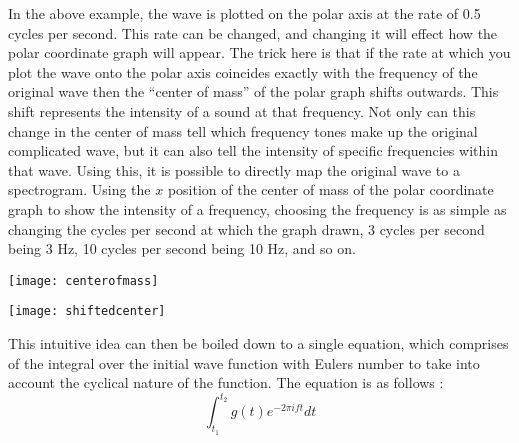 In the above example, the wave is plotted on the polar axis at the rate of 0.5 cycles per second. This rate can be changed, and changing it will effect how the polar coordinate graph will appear. The trick here is that if the rate at which you plot the wave onto the polar axis coincides exactly with the frequency of the original wave then the ``center of mass'' of the polar graph shifts outwards. This shift represents the intensity of a sound at that frequency. Not only can this change in the center of mass tell which frequency tones make up the original complicated wave, but it can also tell the intensity of specific frequencies within that wave. Using this, it is possible to directly map the original wave to a spectrogram. Using the $x$ position of the center of mass of the polar coordinate graph to show the intensity of a frequency, choosing the frequency is as simple as changing the cycles per second at which the graph drawn, 3 cycles per second being 3 Hz, 10 cycles per second being 10 Hz, and so on.
\begin{center}
  \texttt{[image: centerofmass]} \\
\end{center}
\begin{center}
  \texttt{[image: shiftedcenter]} \\[12pt]
  \cite{bluebrown}
\end{center}
This intuitive idea can then be boiled down to a single equation, which comprises of the integral over the initial wave function with Euler\textquotesingle s number to take into account the cyclical nature of the function. The equation is as follows \cite{bluebrown}:
\begin{equation}
  \int_{t_1}^{t_2} g(t)e^{-2\pi i f t} dt
\end{equation} \\[-24pt]
